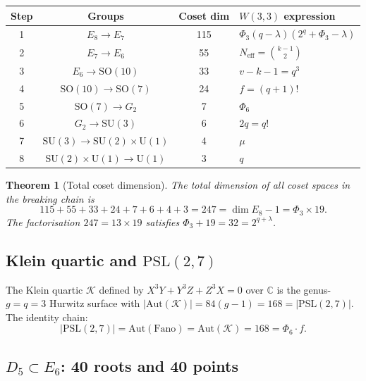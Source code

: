 \documentclass[12pt,a4paper]{article}
\newtheorem{theorem}{Theorem}[section]
\theoremstyle{definition}
\newcommand{\SU}{\mathrm{SU}}
\newcommand{\SO}{\mathrm{SO}}
\newcommand{\Aut}{\mathrm{Aut}}
\newcommand{\Phithree}{\Phi_3}
\newcommand{\Phisix}{\Phi_6}
\newcommand{\Neff}{N_{\mathrm{eff}}}
\newcommand{\CC}{\mathbb{C}}
\newcommand{\PSL}{\mathrm{PSL}}
\begin{document}
\begin{center}
\renewcommand{\arraystretch}{1.25}
\begin{tabular}{cccl}
\toprule
Step & Groups & Coset dim & $W(3,3)$ expression \\
\midrule
1 & $E_8\to E_7$              & 115 & $\Phithree(q-\lambda)(2^q+\Phithree-\lambda)$ \\
2 & $E_7\to E_6$              &  55 & $\Neff = \binom{k-1}{2}$ \\
3 & $E_6\to\SO(10)$           &  33 & $v-k-1 = q^3$ \\
4 & $\SO(10)\to\SO(7)$        &  24 & $f=(q+1)!$ \\
5 & $\SO(7)\to G_2$           &   7 & $\Phisix$ \\
6 & $G_2\to\SU(3)$            &   6 & $2q=q!$ \\
7 & $\SU(3)\to\SU(2)\times\mathrm{U}(1)$ & 4 & $\mu$ \\
8 & $\SU(2)\times\mathrm{U}(1)\to\mathrm{U}(1)$ & 3 & $q$ \\
\bottomrule
\end{tabular}
\end{center}

\begin{theorem}[Total coset dimension]
\label{thm:coset_total}
The total dimension of all coset spaces in the breaking chain is
\begin{equation}
  115+55+33+24+7+6+4+3 = 247 = \dim E_8 - 1 = \Phithree\times 19.
\end{equation}
The factorisation $247=13\times 19$ satisfies $\Phithree+19=32=2^{q+\lambda}$.
\end{theorem}

\subsection{Klein quartic and \texorpdfstring{$\PSL(2,7)$}{PSL(2,7)}}

The Klein quartic $\mathcal{K}$ defined by $X^3Y+Y^3Z+Z^3X=0$ over
$\CC$ is the genus-$g=q=3$ Hurwitz surface with
$|\Aut(\mathcal{K})|=84(g-1)=168=|\PSL(2,7)|$.  The identity chain:
\begin{equation}
  |\PSL(2,7)| = \Aut(\text{Fano}) = \Aut(\mathcal{K}) = 168 = \Phisix\cdot f.
\end{equation}

\subsection{\texorpdfstring{$D_5\subset E_6$}{D5 subset E6}: 40 roots and 40 points}
\end{document}
